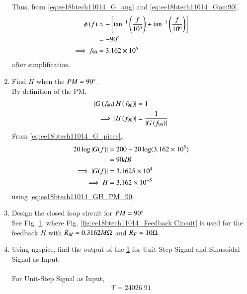 \begin{enumerate}[label=\thesection.\arabic*.,ref=\thesection.\theenumi]
Thus, from  \eqref{eq:ee18btech11014_G_ang} and \eqref{eq:ee18btech11014_Gpm90},
%
\begin{align}
\phi\left(f\right) &\approx
-{}\left[\tan ^{-1}\left(\frac{f}{10^{5}}\right)+\tan ^{-1}\left(\frac{f}{10^{6}}\right)\right]
\\
&= -90 \degree
\\
\implies f_{90} &= 3.162 \times 10^{5}
\end{align}
after simplification.
\item Find $H$ when the $PM = 90 \degree$.
\\
\solution By definition of the PM, 
\begin{align}
\left\vert G\left(f_{90}\right)H\left(f_{90}\right)\right\vert &=1
\\
\implies \left\vert H\left(f_{90}\right)\right\vert &=\frac{1}{\left\vert G\left(f_{90}\right)\right\vert}
\label{eq:ee18btech11014_GH_PM_90}
\end{align}
%
From \eqref{eq:ee18btech11014_G_piece},
\begin{align}
20 \log \left\vert G(f)\right\vert &= 200 - 20\log(3.162 \times 10^{5})\\
&= 90 dB \\
\implies \left\vert G(f)\right\vert &= 3.1625 \times 10^{4}
\\
\implies H &= 3.162 \times 10^{-5}
\end{align}
using \eqref{eq:ee18btech11014_GH_PM_90}.
\item Design the closed loop circuit for $PM = 90 \degree$
\\
\solution See Fig.  	\ref{fig:ee18btech11014_Closed-Loop Circuit alpha=90}, where Fig.  	\ref{fig:ee18btech11014_Feedback Circuit} is used for the feedback $H$ with $R_M = 0.3162 M \ohm$ and 	$R_F = 10 \ohm$.

\begin{figure}[ht!]
	\begin{center}
		\resizebox{\columnwidth}{!}{}
	\end{center}
	\caption{}
	\label{fig:ee18btech11014_Closed-Loop Circuit alpha=90}
\end{figure}

\item Using ngspice, find the output of the \ref{fig:ee18btech11014_Closed-Loop Circuit alpha=90} for Unit-Step Signal and Sinusoidal Signal as Input.\\
\solution\\
For Unit-Step Signal as Input,
\begin{align}
T = 24026.91
\end{align}


\end{enumerate}
